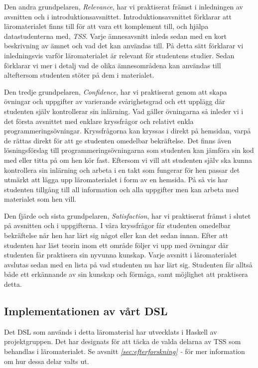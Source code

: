 \documentclass[12pt,a4paper,twoside,openright]{article}
\begin{document}
Den andra grundpelaren, \textit{Relevance}, har vi praktiserat främst
i inledningen av avsnitten och i
introduktionsavsnittet. Introduktionsavsnittet förklarar att
läromaterialet finns till för att vara ett komplement till, och hjälpa
datastudenterna med, \textit{TSS}. Varje ämnesavsnitt inleds sedan med
en kort beskrivning av ämnet och vad det kan användas till. På detta
sätt förklarar vi inledningsvis varför läromaterialet är relevant för
studentens studier. Sedan förklarar vi mer i detalj vad de olika
ämnesområdena kan användas till alteftersom studenten stöter på dem i
materialet.

Den tredje grundpelaren, \textit{Confidence}, har vi praktiserat genom
att skapa övningar och uppgifter av varierande svårighetsgrad och ett
upplägg där studenten själv kontrollerar sin inlärning. Vad gäller
övningarna så inleder vi i det första avsnittet med enklare
kryssfrågor och relativt enkla programmeringsövningar. Kryssfrågorna
kan kryssas i direkt på hemsidan, varpå de rättas direkt för att ge
studenten omedelbar bekräftelse. Det finns även lösningsförslag till
programmeringsövningarna som studenten kan jämföra sin kod med eller
titta på om hen kör fast. Eftersom vi vill att studenten själv ska
kunna kontrollera sin inlärning och arbeta i en takt som fungerar för
hen passar det utmärkt att lägga upp läromaterialet i form av en
hemsida. På så vis har studenten tillgång till all information och
alla uppgifter men kan arbeta med materialet som hen vill.

Den fjärde och sista grundpelaren, \textit{Satisfaction}, har vi
praktiserat främst i slutet på avsnitten och i uppgifterna. I våra
kryssfrågor får studenten omedelbar bekräftelse när hen har lärt sig
något eller kan det sedan innan. Efter att studenten har läst teorin
inom ett område följer vi upp med övningar där studenten får
praktisera sin nyvunna kunskap. Varje avsnitt i läromaterialet
avslutas sedan med en lista på vad studenten nu har lärt
sig. Studenten får alltså både ett erkännande av sin kunskap och
förmåga, samt möjlighet att praktisera detta.

\subsection{Implementationen av vårt DSL}
\label{sec:implDSL}
Det DSL som används i detta läromaterial har utvecklats i Haskell av
projektgruppen. Det har designats för att täcka de valda delarna av
TSS som behandlas i läromaterialet. Se avsnitt
\textit{\ref{sec:efterforskning} - } för mer
information om hur dessa delar valts ut.
\end{document}
